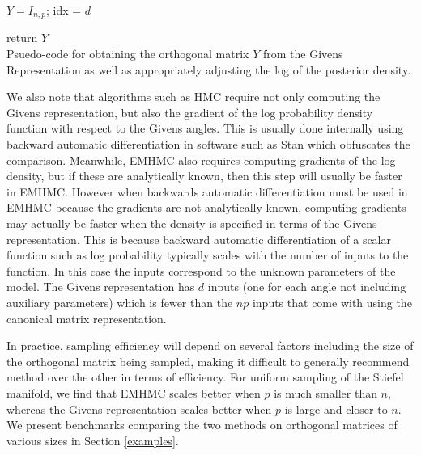 \documentclass[ba]{imsart}
\numberwithin{equation}{section}
\theoremstyle{plain}
\begin{document}
\begin{algorithm}[h]
\SetAlgoLined
\KwIn{$\theta$}
$Y = I_{n,p}$;
 idx = $d$
 
return $Y$
\\
\caption{Psuedo-code for obtaining the orthogonal matrix $Y$ from the Givens Representation as well as appropriately adjusting the log of the posterior density.}
 \label{alg:givens}
\end{algorithm}

\noindent We also note that algorithms such as HMC require not only computing the Givens representation, but also the gradient of the log probability density function with respect to the Givens angles. This is usually done internally using backward automatic differentiation in software such as Stan which obfuscates the comparison. Meanwhile, EMHMC also requires computing gradients of the log density, but if these are analytically known, then this step will usually be faster in EMHMC. However when backwards automatic differentiation must be used in EMHMC because the gradients are not analytically known, computing gradients may actually be faster when the density is specified in terms of the Givens representation.  This is because backward automatic differentiation of a scalar function such as log probability typically scales with the number of inputs to the function. In this case the inputs correspond to the unknown parameters of the model. The Givens representation has $d$ inputs (one for each angle not including auxiliary parameters) which is fewer than the $np$ inputs that come with using the canonical matrix representation.

\noindent In practice, sampling efficiency will depend on several factors including the size of the orthogonal matrix being sampled, making it difficult to generally recommend method over the other in terms of efficiency. For uniform sampling of the Stiefel manifold, we find that EMHMC scales better when $p$ is much smaller than $n$, whereas the Givens representation scales better when $p$ is large and closer to $n$. We present benchmarks comparing the two methods on orthogonal matrices of various sizes in Section \ref{examples}.
\end{document}
